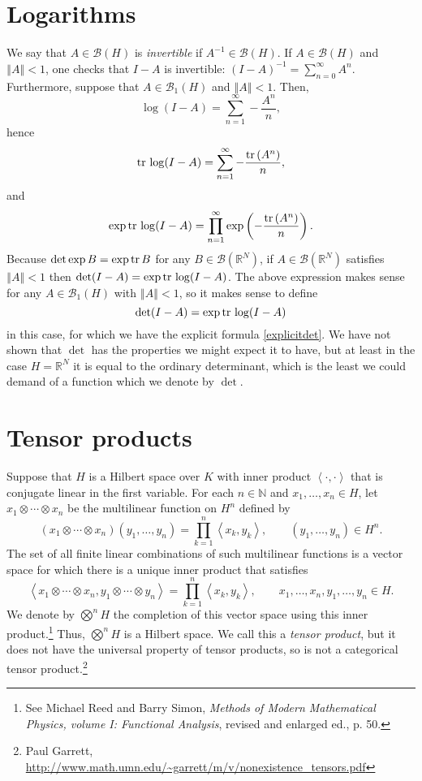 \documentclass{article}
\newcommand{\inner}[2]{\left\langle #1, #2 \right\rangle}
\newcommand{\tr}{\ensuremath\mathrm{tr}\,}
\newcommand{\norm}[1]{\left\Vert #1 \right\Vert}
\theoremstyle{definition}
\begin{document}
\section{Logarithms}
We say that $A \in \mathscr{B}(H)$ is {\em invertible} if $A^{-1} \in \mathscr{B}(H)$.  
If $A \in \mathscr{B}(H)$ and $\norm{A}<1$, one checks that  $I-A$ is invertible: $(I-A)^{-1}= \sum_{n=0}^\infty A^n$. Furthermore, suppose that $A \in \mathscr{B}_1(H)$ and $\norm{A}<1$. Then,
\[
\log(I-A)=\sum_{n=1}^\infty -\frac{A^n}{n},
\]
hence
\[
\tr \log(I-A) = \sum_{n=1}^\infty -\frac{\tr(A^n)}{n},
\]
and
\begin{equation}
\exp \tr \log(I-A) = \prod_{n=1}^\infty \exp\left(-\frac{\tr(A^n)}{n}\right).
\label{explicitdet}
\end{equation}
Because $\det \exp B=\exp \tr B$ for any $B \in \mathscr{B}(\mathbb{R}^N)$, if $A \in \mathscr{B}(\mathbb{R}^N)$ satisfies $\norm{A}<1$ then
$\det (I-A)= \exp \tr \log (I-A)$.
The above expression makes
sense for any $A \in \mathscr{B}_1(H)$ with $\norm{A}<1$, so it makes sense to define
\[
\det (I-A)=\exp \tr \log (I-A)
\]
 in this case, for which we have the explicit formula \eqref{explicitdet}.
We have not shown that
$\det$ has the properties we might expect it to have, but at least in the case $H=\mathbb{R}^N$ it is equal to the ordinary
determinant, which is
the least we could demand of a function which we denote by $\det$.



\section{Tensor products} 
Suppose that $H$ is a Hilbert space over $K$ with inner product
$\inner{\cdot}{\cdot}$  that is conjugate linear in the first variable.
For each $n \in \mathbb{N}$ and $x_1,\ldots,x_n \in H$, let $x_1 \otimes \cdots \otimes x_n$  be the  multilinear function
on $H^n$ defined by 
\[
(x_1 \otimes \cdots \otimes x_n)(y_1,\ldots,y_n) = \prod_{k=1}^n \inner{x_k}{y_k}, \qquad (y_1,\ldots,y_n) \in H^n.
\]
The set of all finite linear combinations of such  multilinear functions is a vector  space for which there is a unique inner product that satisfies
\[
\inner{x_1 \otimes \cdots \otimes x_n}{y_1 \otimes \cdots \otimes y_n} = \prod_{k=1}^n \inner{x_k}{y_k}, \qquad
x_1,\ldots,x_n,y_1,\ldots,y_n \in H.
\]
We denote by $\bigotimes^n H$ the completion of this vector space using this inner product.\footnote{See
Michael Reed and Barry Simon, {\em Methods of Modern Mathematical Physics, volume I: Functional Analysis}, revised and enlarged
ed., p. 50.}
Thus,
$\bigotimes^n H$ is a Hilbert space.
We call this a {\em tensor product}, but it does not have the universal
property of tensor products, so is not a categorical tensor product.\footnote{Paul Garrett, \url{http://www.math.umn.edu/~garrett/m/v/nonexistence_tensors.pdf}} 
\end{document}

